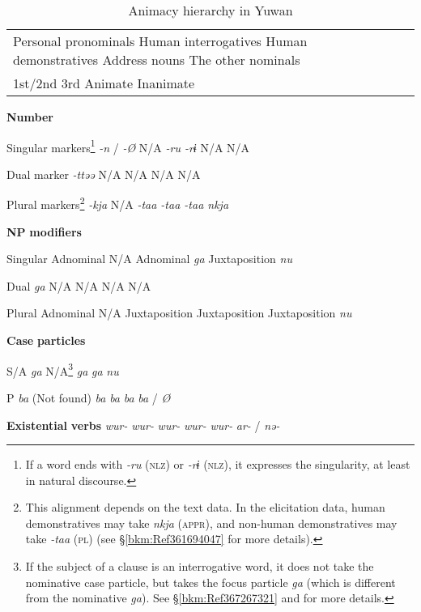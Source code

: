 \begin{table}
\caption{\label{tab:key:44}Animacy hierarchy in Yuwan}
\begin{tabular}{lllll}
  Personal pronominals  Human interrogatives  Human demonstratives  Address nouns  The other nominals\\
  1st/2nd  3rd        Animate  Inanimate\\
\end{tabular}

  \textbf{Number}

Singular markers\footnote{If a word ends with \textit{-ru} (\textsc{nlz}) or \textit{-rɨ} (\textsc{nlz}), it expresses the singularity, at least in natural discourse.}  \textit{-n} / \textit{-Ø}  N/A  \textit{-ru  -rɨ} N/A  N/A

Dual marker     \textit{-ttəə} N/A  N/A  N/A  N/A

Plural markers\footnote{This alignment depends on the text data. In the elicitation data, human demonstratives may take \textit{nkja} (\textsc{appr}), and non-human demonstratives may take \textit{-taa} (\textsc{pl}) (see §\ref{bkm:Ref361694047} for more details).}  \textit{-kja} N/A  \textit{-taa  -taa  -taa  nkja}

\textbf{NP} \textbf{modifiers}          

Singular  Adnominal  N/A  Adnominal  \textit{ga}  Juxtaposition  \textit{nu}

Dual     \textit{ga}  N/A  N/A  N/A  N/A

Plural  Adnominal  N/A  Juxtaposition  Juxtaposition  Juxtaposition  \textit{nu}

\textbf{Case} \textbf{particles}          

S/A     \textit{ga}  N/A\footnote{If the subject of a clause is an interrogative word, it does not take the nominative case particle, but takes the focus particle \textit{ga} (which is different from the nominative \textit{ga}). See §\ref{bkm:Ref367267321} and  for more details.}  \textit{ga}  \textit{ga}  \textit{nu}

P     \textit{ba}  (Not found)  \textit{ba}  \textit{ba}  \textit{ba}  \textit{ba} / \textit{Ø}

\textbf{Existential} \textbf{verbs}      \textit{wur-}  \textit{wur-}  \textit{wur-}  \textit{wur-}  \textit{wur-}  \textit{ar-} / \textit{nə-}
\end{table}

